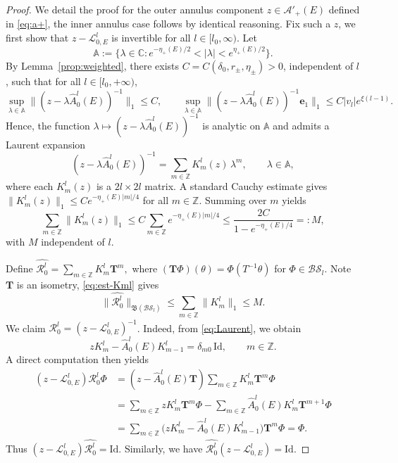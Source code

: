 \documentclass[reqno,11pt]{amsart}
\begin{document}
\begin{proof}
We detail the proof for the outer annulus component $z\in\mathcal A'_+(E)$ defined in \eqref{eq:a+}, the inner annulus case follows by identical reasoning. Fix such a $z$, we first show that $z-\mathcal{L}^{l}_{0,E}$ is invertible for all $l\in[l_0,\infty)$. Let
$$
\mathbb{A} := \{\lambda\in\mathbb{C}: e^{-\eta_+(E)/2} < |\lambda| < e^{\eta_+(E)/2}\}.
$$
By Lemma~\ref{prop:weighted}, there exists $C=C(\delta_0, r_\pm,\eta_\pm)>0$, independent of $l$, such that for all $l\in[l_0,+\infty)$,
\begin{equation}\label{eq:Est-lambda}
    \sup_{\lambda\in\mathbb{A}} \bigl\| (z-\lambda\widehat A_{0}^{l}(E))^{-1} \bigr\|_{1} \le C, \qquad\sup_{\lambda\in\mathbb{A}} \bigl\| (z-\lambda\widehat A_{0}^{l}(E))^{-1} \mathbf{e}_1\bigr\|_{1} \le C|v_l| e^{\xi(l-1)}. 
\end{equation}
Hence, the function $\lambda\mapsto (z-\lambda\widehat A_{0}^{l}(E))^{-1}$ is analytic on $\mathbb{A}$ and admits a Laurent expansion
\begin{equation}\label{eq:Laurent}
    (z-\lambda\widehat A_{0}^{l}(E))^{-1} = \sum_{m\in\mathbb{Z}} K_m^{l}(z)\,\lambda^m, \qquad \lambda\in\mathbb{A},
\end{equation}
where each $K_m^{l}(z)$ is a $2l\times 2l$ matrix.
A standard Cauchy estimate gives $\|K_m^{l}(z)\|_{1} \le C e^{-\eta_+(E)|m|/4}$ for all $m\in\mathbb Z$. Summing over $m$ yields
\begin{equation}\label{eq:est-Kml}
\sum_{m\in\mathbb Z}\|K_m^{l}(z)\|_{1}
\le C\sum_{m\in\mathbb Z} e^{-\eta_+(E)|m|/4}
\le \frac{2C}{1-e^{-\eta_+(E)/4}} =: M,
\end{equation}
with $M$ independent of $l$.

Define
$\widehat{\mathcal{R}^{l}_{0}} = \sum_{m\in\mathbb Z}K_m^{l} \mathbf T^m ,$
where $(\mathbf T\Phi)(\theta)=\Phi(T^{-1}\theta)$ for $\Phi\in\mathcal{BS}_l$. Note $\mathbf T$ is an isometry, \eqref{eq:est-Kml} gives $$
\|\widehat{\mathcal{R}^{l}_{0}}\|_{\mathfrak{B}(\mathcal{BS}_l )} \le \sum_{m\in\mathbb Z}\|K_m^l\|_{1} \le M.
$$
We claim $\widehat{\mathcal{R}^{l}_{0}}=(z-\mathcal{L}^{l}_{0,E})^{-1}$. Indeed, from \eqref{eq:Laurent}, we obtain
\begin{equation*}\label{equ:laurent}
zK_m^{l} - \widehat A_{0}^{l}(E) K_{m-1}^{l} = \delta_{m0}\,\mathrm{Id}, \qquad m\in\mathbb Z.
\end{equation*}
A direct computation then yields
$$
\begin{aligned}
(z-\mathcal{L}^{l}_{0,E})\widehat{\mathcal{R}^{l}_{0}}\Phi
&= (z-\widehat A_{0}^{l}(E)\mathbf T)\sum_{m\in\mathbb Z}K_m^{l} \mathbf T^m\Phi \\
&= \sum_{m\in\mathbb Z}zK_m^{l}\mathbf T^m\Phi - \sum_{m\in\mathbb Z}\widehat A_{0}^{l}(E)K_m^{l}\mathbf T^{m+1}\Phi \\
&= \sum_{m\in\mathbb Z}\bigl(zK_m^{l}-\widehat A_{0}^{l}(E)K_{m-1}^{l}\bigr)\mathbf T^{m}\Phi = \Phi.
\end{aligned}
$$
Thus $(z-\mathcal{L}^{l}_{0,E})\widehat{\mathcal{R}^{l}_{0}}=\mathrm{Id}$. Similarly, we have $\widehat{\mathcal{R}^{l}_{0}}(z-\mathcal{L}^{l}_{0,E})=\mathrm{Id}$.





\end{proof}
\end{document}

